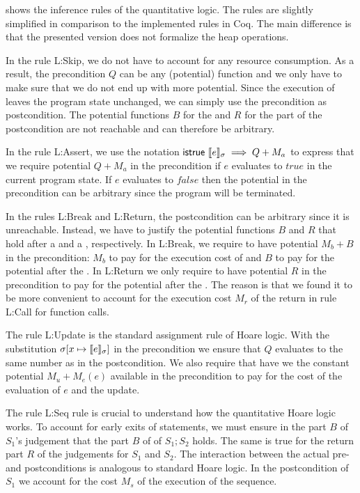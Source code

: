 \documentclass[nocopyrightspace,preprint,pldi]{sigplanconf-pldi15}
\newcommand{\pref}[1]{\prettyref{#1}}
\begin{document}
{\pref{fig:logicapp} shows the inference rules of the quantitative logic.
The rules are slightly simplified in comparison to the implemented
rules in Coq.  The main difference is that the presented version does
not formalize the heap operations.

In the rule {\sc L:Skip}, we do not have to account for any resource
consumption.  As a result, the precondition $Q$ can be any (potential)
function and we only have to make sure that we do not end up with more
potential.  Since the execution of  leaves the program
state unchanged, we can simply use the precondition as postcondition.
The potential functions $B$ for the  and $R$ for the
 part of the postcondition are not reachable and can
therefore be arbitrary.

In the rule {\sc L:Assert}, we use the notation
$\mathsf{istrue}~\llbracket e \rrbracket_{\sigma} \implies Q + M_a$ to express that we
require potential $Q + M_a$ in the precondition if $e$ evaluates to
$\mathit{true}$ in the current program state.  If $e$ evaluates to
$\mathit{false}$ then the potential in the precondition can be
arbitrary since the program will be terminated.

In the rules {\sc L:Break} and {\sc L:Return}, the postcondition can
be arbitrary since it is unreachable.  Instead, we have to justify the
potential functions $B$ and $R$ that hold after a  and a
, respectively.  In {\sc L:Break}, we require to have
potential $M_b+B$ in the precondition: $M_b$ to pay for the execution
cost of  and $B$ to pay for the potential after the
.  In {\sc L:Return} we only require to have potential
$R$ in the precondition to pay for the potential after the
.  The reason is that we found it to be more convenient
to account for the execution cost $M_r$ of the return in rule {\sc
  L:Call} for function calls.

The rule {\sc L:Update} is the standard assignment rule of Hoare
logic.  With the substitution $\sigma[x \mapsto \llbracket e \rrbracket_{\sigma}]$ in
the precondition we ensure that $Q$ evaluates to the same number as in
the postcondition.  We also require that have we the constant
potential $M_u + M_e(e)$ available in the precondition to pay for the
cost of the evaluation of $e$ and the update.

The rule {\sc L:Seq} rule is crucial to understand how the
quantitative Hoare logic works.  To account for early exits of
statements, we must ensure in the  part $B$ of $S_1$'s
judgement that the  part $B$ of of $S_1;S_2$ holds. The
same is true for the return part $R$ of the judgements for $S_1$ and
$S_2$.  The interaction between the actual pre- and postconditions is
analogous to standard Hoare logic.  In the postcondition of $S_1$ we
account for the cost $M_s$ of the execution of the sequence.

}
\end{document}
